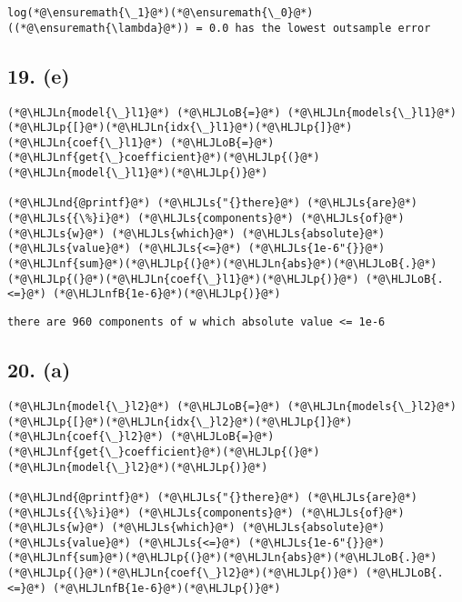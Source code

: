 \documentclass[12pt,a4paper]{article}
\newcommand{\HLJLn}[1]{#1}
\newcommand{\HLJLnd}[1]{\textcolor[RGB]{214,102,97}{#1}}
\newcommand{\HLJLnf}[1]{\textcolor[RGB]{66,102,213}{#1}}
\newcommand{\HLJLs}[1]{\textcolor[RGB]{201,61,57}{#1}}
\newcommand{\HLJLnfB}[1]{\textcolor[RGB]{59,151,46}{#1}}
\newcommand{\HLJLoB}[1]{\textcolor[RGB]{102,102,102}{\textbf{#1}}}
\newcommand{\HLJLp}[1]{#1}
\begin{document}
\begin{lstlisting}
log(*@\ensuremath{\_1}@*)(*@\ensuremath{\_0}@*)((*@\ensuremath{\lambda}@*)) = 0.0 has the lowest outsample error
\end{lstlisting}


\subsection{19. (e)}

\begin{lstlisting}
(*@\HLJLn{model{\_}l1}@*) (*@\HLJLoB{=}@*) (*@\HLJLn{models{\_}l1}@*)(*@\HLJLp{[}@*)(*@\HLJLn{idx{\_}l1}@*)(*@\HLJLp{]}@*)
(*@\HLJLn{coef{\_}l1}@*) (*@\HLJLoB{=}@*) (*@\HLJLnf{get{\_}coefficient}@*)(*@\HLJLp{(}@*)(*@\HLJLn{model{\_}l1}@*)(*@\HLJLp{)}@*)

(*@\HLJLnd{@printf}@*) (*@\HLJLs{"{}there}@*) (*@\HLJLs{are}@*) (*@\HLJLs{{\%}i}@*) (*@\HLJLs{components}@*) (*@\HLJLs{of}@*) (*@\HLJLs{w}@*) (*@\HLJLs{which}@*) (*@\HLJLs{absolute}@*) (*@\HLJLs{value}@*) (*@\HLJLs{<=}@*) (*@\HLJLs{1e-6"{}}@*) (*@\HLJLnf{sum}@*)(*@\HLJLp{(}@*)(*@\HLJLn{abs}@*)(*@\HLJLoB{.}@*)(*@\HLJLp{(}@*)(*@\HLJLn{coef{\_}l1}@*)(*@\HLJLp{)}@*) (*@\HLJLoB{.<=}@*) (*@\HLJLnfB{1e-6}@*)(*@\HLJLp{)}@*)
\end{lstlisting}

\begin{lstlisting}
there are 960 components of w which absolute value <= 1e-6
\end{lstlisting}


\subsection{20. (a)}

\begin{lstlisting}
(*@\HLJLn{model{\_}l2}@*) (*@\HLJLoB{=}@*) (*@\HLJLn{models{\_}l2}@*)(*@\HLJLp{[}@*)(*@\HLJLn{idx{\_}l2}@*)(*@\HLJLp{]}@*)
(*@\HLJLn{coef{\_}l2}@*) (*@\HLJLoB{=}@*) (*@\HLJLnf{get{\_}coefficient}@*)(*@\HLJLp{(}@*)(*@\HLJLn{model{\_}l2}@*)(*@\HLJLp{)}@*)

(*@\HLJLnd{@printf}@*) (*@\HLJLs{"{}there}@*) (*@\HLJLs{are}@*) (*@\HLJLs{{\%}i}@*) (*@\HLJLs{components}@*) (*@\HLJLs{of}@*) (*@\HLJLs{w}@*) (*@\HLJLs{which}@*) (*@\HLJLs{absolute}@*) (*@\HLJLs{value}@*) (*@\HLJLs{<=}@*) (*@\HLJLs{1e-6"{}}@*) (*@\HLJLnf{sum}@*)(*@\HLJLp{(}@*)(*@\HLJLn{abs}@*)(*@\HLJLoB{.}@*)(*@\HLJLp{(}@*)(*@\HLJLn{coef{\_}l2}@*)(*@\HLJLp{)}@*) (*@\HLJLoB{.<=}@*) (*@\HLJLnfB{1e-6}@*)(*@\HLJLp{)}@*)
\end{lstlisting}
\end{document}
